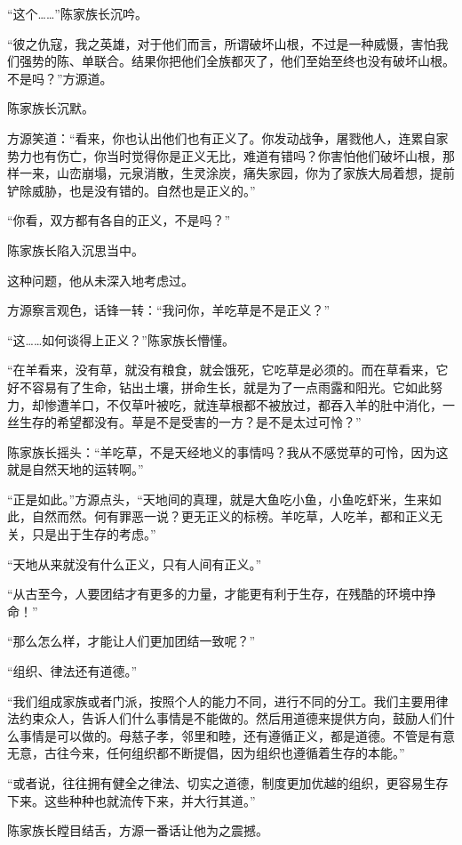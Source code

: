 \begin{this_body}
“这个……”陈家族长沉吟。

“彼之仇寇，我之英雄，对于他们而言，所谓破坏山根，不过是一种威慑，害怕我们强势的陈、单联合。结果你把他们全族都灭了，他们至始至终也没有破坏山根。不是吗？”方源道。

陈家族长沉默。

方源笑道：“看来，你也认出他们也有正义了。你发动战争，屠戮他人，连累自家势力也有伤亡，你当时觉得你是正义无比，难道有错吗？你害怕他们破坏山根，那样一来，山峦崩塌，元泉消散，生灵涂炭，痛失家园，你为了家族大局着想，提前铲除威胁，也是没有错的。自然也是正义的。”

“你看，双方都有各自的正义，不是吗？”

陈家族长陷入沉思当中。

这种问题，他从未深入地考虑过。

方源察言观色，话锋一转：“我问你，羊吃草是不是正义？”

“这……如何谈得上正义？”陈家族长懵懂。

“在羊看来，没有草，就没有粮食，就会饿死，它吃草是必须的。而在草看来，它好不容易有了生命，钻出土壤，拼命生长，就是为了一点雨露和阳光。它如此努力，却惨遭羊口，不仅草叶被吃，就连草根都不被放过，都吞入羊的肚中消化，一丝生存的希望都没有。草是不是受害的一方？是不是太过可怜？”

陈家族长摇头：“羊吃草，不是天经地义的事情吗？我从不感觉草的可怜，因为这就是自然天地的运转啊。”

“正是如此。”方源点头，“天地间的真理，就是大鱼吃小鱼，小鱼吃虾米，生来如此，自然而然。何有罪恶一说？更无正义的标榜。羊吃草，人吃羊，都和正义无关，只是出于生存的考虑。”

“天地从来就没有什么正义，只有人间有正义。”

“从古至今，人要团结才有更多的力量，才能更有利于生存，在残酷的环境中挣命！”

“那么怎么样，才能让人们更加团结一致呢？”

“组织、律法还有道德。”

“我们组成家族或者门派，按照个人的能力不同，进行不同的分工。我们主要用律法约束众人，告诉人们什么事情是不能做的。然后用道德来提供方向，鼓励人们什么事情是可以做的。母慈子孝，邻里和睦，还有遵循正义，都是道德。不管是有意无意，古往今来，任何组织都不断提倡，因为组织也遵循着生存的本能。”

“或者说，往往拥有健全之律法、切实之道德，制度更加优越的组织，更容易生存下来。这些种种也就流传下来，并大行其道。”

陈家族长瞠目结舌，方源一番话让他为之震撼。


\end{this_body}
